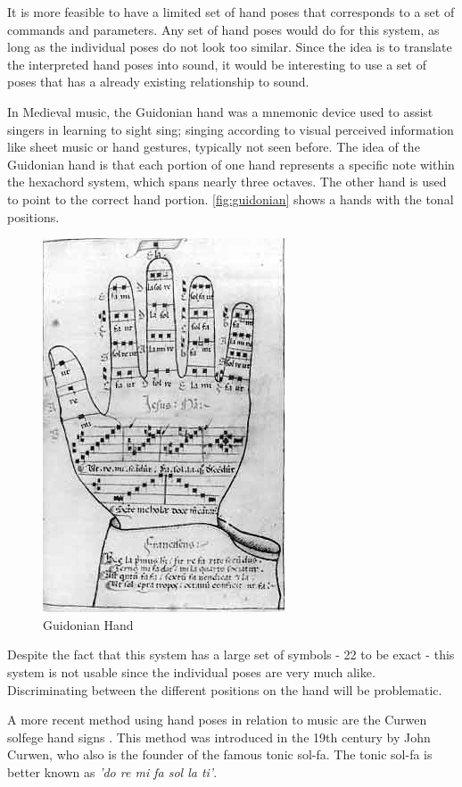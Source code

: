It is more feasible to have a limited set of hand poses that corresponds to a set of commands and parameters.  Any set of hand poses would do for this system, as long as the individual poses do not look too similar. Since the idea is to translate the interpreted hand poses into sound, it would be interesting to use a set of poses that has a already existing relationship to sound.

In Medieval music, the Guidonian hand was a mnemonic device used to assist singers in learning to sight sing; singing according to visual perceived information like sheet music or hand gestures, typically not seen before. The idea of the Guidonian hand is that each portion of one hand represents a specific note within the hexachord system, which spans nearly three octaves. The other hand is used to point to the correct hand portion. \autoref{fig:guidonian} shows a hands with the tonal positions.

\begin{figure}[tb]
	\centering{}
	\includegraphics[width=0.3\linewidth]{figures/guidonian_hand.jpg}
	\caption{Guidonian Hand}
	\label{fig:guidonian}
\end{figure}

Despite the fact that this system has a large set of symbols - 22 to be exact - this system is not usable since the individual poses are very much alike. Discriminating between the different positions on the hand will be problematic.

A more recent method using hand poses in relation to music are the Curwen solfege hand signs \citep{choksy1999}. This method was introduced in the 19th century by John Curwen, who also is the founder of the famous tonic sol-fa. The tonic sol-fa is better known as \emph{'do re mi fa sol la ti'}.

